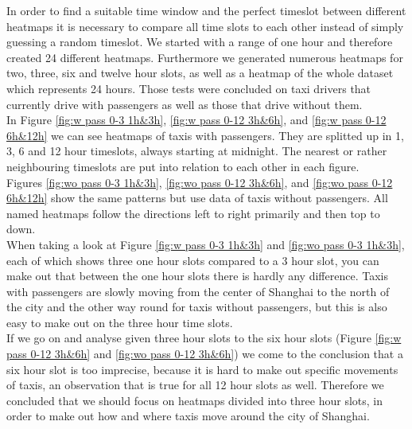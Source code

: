 \documentclass[11pt,conference,a4paper,twocolumns,romanappendices]{IEEEtran}
\begin{document}
In order to find a suitable time window and the perfect timeslot between different heatmaps it is necessary to compare all time slots to each other instead of simply guessing a random timeslot. We started with a range of one hour and therefore created 24 different heatmaps. Furthermore we generated numerous heatmaps for two, three, six and twelve hour slots, as well as a heatmap of the whole dataset which represents 24 hours. Those tests were concluded on taxi drivers that currently drive with passengers as well as those that drive without them.\\
In Figure \ref{fig:w pass 0-3 1h&3h}, \ref{fig:w pass 0-12 3h&6h}, and \ref{fig:w pass 0-12 6h&12h} we can see heatmaps of taxis with passengers. They are splitted up in 1, 3, 6 and 12 hour timeslots, always starting at midnight. The nearest or rather neighbouring timeslots are put into relation to each other in each figure.\\
Figures \ref{fig:wo pass 0-3 1h&3h}, \ref{fig:wo pass 0-12 3h&6h}, and \ref{fig:wo pass 0-12 6h&12h} show the same patterns but use data of taxis without passengers.
All named heatmaps follow the directions left to right primarily and then top to down. \\
When taking a look at Figure \ref{fig:w pass 0-3 1h&3h} and \ref{fig:wo pass 0-3 1h&3h}, each of which shows three one hour slots compared to a 3 hour slot, you can make out that between the one hour slots there is hardly any difference. Taxis with passengers are slowly moving from the center of Shanghai to the north of the city and the other way round for taxis without passengers, but this is also easy to make out on the three hour time slots.\\
If we go on and analyse given three hour slots to the six hour slots (Figure \ref{fig:w pass 0-12 3h&6h} and \ref{fig:wo pass 0-12 3h&6h}) we come to the conclusion that a six hour slot is too imprecise, because it is hard to make out specific movements of taxis, an observation that is true for all 12 hour slots as well. Therefore we concluded that we should focus on heatmaps divided into three hour slots, in order to make out how and where taxis move around the city of Shanghai.
\end{document}
